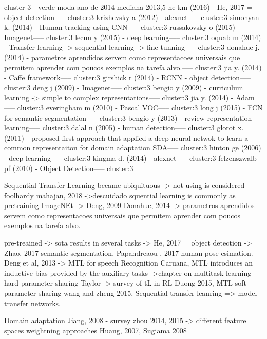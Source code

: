\documentclass[sigconf]{acmart}
\begin{document}
cluster 3 - verde
  moda ano de 2014
  mediana 2013,5
  he km (2016) - He, 2017 = object detection----- cluster:3
  krizhevsky a (2012) - alexnet----- cluster:3
  simonyan k. (2014) - Human tracking using CNN----- cluster:3
  russakovsky o (2015) - Imagenet----- cluster:3
  lecun y (2015) - deep learning----- cluster:3
  oquab m (2014) - Transfer learning -> sequential learning -> fine tunning----- cluster:3
  donahue j. (2014) - parametros aprendidos servem como representacoes universais que permitem aprender com poucos exemplos na tarefa alvo.----- cluster:3
  jia y. (2014) - Caffe framework----- cluster:3
  girshick r (2014) - RCNN - object detection----- cluster:3
  deng j (2009) - Imagenet----- cluster:3
  bengio y (2009) - curriculum learning -> simple to complex representations----- cluster:3
  jia y. (2014) - Adam----- cluster:3
  everingham m (2010) - Pascal VOC----- cluster:3
  long j (2015) - FCN for semantic segmentation----- cluster:3
  bengio y (2013) - review representation learning----- cluster:3
  dalal n (2005) - human detection----- cluster:3
  glorot x. (2011) - proposed first approach that applied a deep neural netwok to learn a common representaiton for domain adaptation  SDA----- cluster:3
  hinton ge (2006) - deep learning----- cluster:3
  kingma d. (2014) - alexnet----- cluster:3
  felzenszwalb pf (2010) - Object Detection----- cluster:3


  Sequential Transfer Learning became ubiquituous -> not using is considered foolhardy mahajan, 2018 ->descuidado
  squential learning is commonly as pretraining ImageNEt -> Deng, 2009
  Donahue, 2014 -> parametros aprendidos servem como representacoes universais que permitem aprender com poucos exemplos na tarefa alvo.

  pre-treained -> sota results in several tasks -> He, 2017 = object detection -> Zhao, 2017 semantic segmentation, Papandreaou , 2017 human pose esimation.
  Deng et al, 2013 -> MTL for speech Recognition
  Caruana, MTL introduces an inductive bias provided by the auxiliary tasks ->chapter on multitask learning - hard parameter sharing
  Taylor -> survey of tL in RL
  Duong 2015, MTL soft parameter sharing
  wang and zheng 2015, Sequential transfer leanring => model transfer
networks.


  Domain adaptation
  Jiang, 2008 - survey
  zhou 2014, 2015 -> different feature spaces 
  weightning approaches Huang, 2007, Sugiama 2008
      
\end{document}
